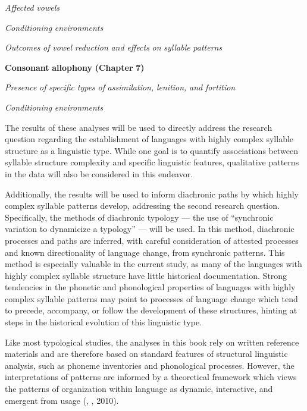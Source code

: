 \textit{Affected} \textit{vowels}



\textit{Conditioning} \textit{environments}



\textit{Outcomes} \textit{of} \textit{vowel} \textit{reduction} \textit{and} \textit{effects} \textit{on} \textit{syllable} \textit{patterns}



\textbf{Consonant} \textbf{allophony} \textbf{(Chapter} \textbf{7)}



\textit{Presence} \textit{of} \textit{specific} \textit{types} \textit{of} \textit{assimilation,} \textit{lenition,} \textit{and} \textit{fortition}



\textit{Conditioning} \textit{environments}
\z



  The results of these analyses will be used to directly address the research question regarding the establishment of languages with highly complex syllable structure as a linguistic type. While one goal is to quantify associations between syllable structure complexity and specific linguistic features, qualitative patterns in the data will also be considered in this endeavor.



  Additionally, the results will be used to inform diachronic paths by which highly complex syllable patterns develop, addressing the second research question. Specifically, the methods of diachronic typology — the use of “synchronic variation to dynamicize a typology” \citep[272]{Croft2003} — will be used. In this method, diachronic processes and paths are inferred, with careful consideration of attested processes and known directionality of language change, from synchronic patterns. This method is especially valuable in the current study, as many of the languages with highly complex syllable structure have little historical documentation. Strong tendencies in the phonetic and phonological properties of languages with highly complex syllable patterns may point to processes of language change which tend to precede, accompany, or follow the development of these structures, hinting at steps in the historical evolution of this linguistic type.



  Like most typological studies, the analyses in this book rely on written reference materials and are therefore based on standard features of structural linguistic analysis, such as phoneme inventories and phonological processes. However, the interpretations of patterns are informed by a theoretical framework which views the patterns of organization within language as dynamic, interactive, and emergent from usage (\citealt{BecknerEtAl2009}, \citealt{Bybee2001}, 2010).



